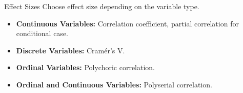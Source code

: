 \documentclass{beamer}
\def\ci{\perp\!\!\!\!\!\perp}
\begin{document}
% 
% 	
% 		
% 	
% 
% 
% 		
% 
% 
% 
% 	
% 				
% 

\begin{frame}{Effect Sizes}
	Choose effect size depending on the variable type.

	\vspace{2em}
	\begin{itemize}
		\item \textbf{Continuous Variables:} Correlation coefficient, partial correlation for conditional case.
		\item \textbf{Discrete Variables:} Cram\'er's V.
		\item \textbf{Ordinal Variables: } Polychoric correlation.
		\item \textbf{Ordinal and Continuous Variables:} Polyserial correlation.
	\end{itemize}

	\vspace{2em}

\end{frame}
\end{document}
